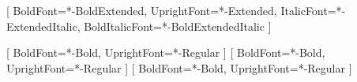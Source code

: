 \usepackage{fontspec}
\setmonofont{Iosevka Term}[
  BoldFont=*-BoldExtended,
  UprightFont=*-Extended,
  ItalicFont=*-ExtendedItalic,
  BoldItalicFont=*-BoldExtendedItalic
]
\usepackage{luatexja}
\usepackage{luatexja-fontspec}
[
  BoldFont=*-Bold,
  UprightFont=*-Regular
]
[
  BoldFont=*-Bold,
  UprightFont=*-Regular
]
[
  BoldFont=*-Bold,
  UprightFont=*-Regular
]
\usepackage{luatexja-ruby}
\usepackage{setspace} %
\usepackage{url}
\usepackage{graphicx}
\usepackage{float}
\usepackage{booktabs}
\usepackage{enumitem}
 
\usepackage{emptypage}
\usepackage{subcaption}
\usepackage{multicol}
\usepackage[dvipsnames]{xcolor}


\usepackage{amsmath, amsfonts, mathtools, amsthm, amssymb}
\usepackage{mathrsfs}
\usepackage{cancel}
\usepackage{bm}
\newcommand\N{\ensuremath{\mathbb{N}}}
\newcommand\R{\ensuremath{\mathbb{R}}}
\newcommand\Z{\ensuremath{\mathbb{Z}}}
\renewcommand\O{\ensuremath{\emptyset}}
\newcommand\Q{\ensuremath{\mathbb{Q}}}
\newcommand\C{\ensuremath{\mathbb{C}}}
\newcommand\dd{\mathrm{d}}
\newcommand\evalat[2]{\left.#1\right|_{#2}}
\DeclareMathOperator{\sgn}{sgn}
\DeclareMathOperator{\Ker}{ker}
\DeclareMathOperator{\im}{Im}
\let\svlim\lim\def\lim{\svlim\limits}
\let\implies\Rightarrow%
\let\impliedby\Leftarrow%
\let\iff\Leftrightarrow%
\let\epsilon\varepsilon%
\DeclarePairedDelimiter\abs{\lvert}{\rvert}
\DeclarePairedDelimiter\norm{\lVert}{\rVert}
\usepackage{stmaryrd} %
\newcommand\contra{\scalebox{1.1}{$\lightning$}}

